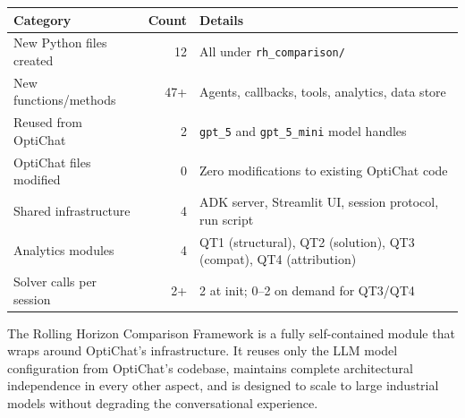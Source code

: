 \documentclass[11pt, a4paper]{article}
\begin{document}
\begin{center}
\begin{tabular}{lrl}
\toprule
\textbf{Category} & \textbf{Count} & \textbf{Details} \\
\midrule
New Python files created      & 12  & All under \texttt{rh\_comparison/} \\
New functions/methods          & 47+ & Agents, callbacks, tools, analytics, data store \\
Reused from OptiChat           & 2   & \texttt{gpt\_5} and \texttt{gpt\_5\_mini} model handles \\
OptiChat files modified        & 0   & Zero modifications to existing OptiChat code \\
Shared infrastructure          & 4   & ADK server, Streamlit UI, session protocol, run script \\
Analytics modules              & 4   & QT1 (structural), QT2 (solution), QT3 (compat), QT4 (attribution) \\
Solver calls per session       & 2+  & 2 at init; 0--2 on demand for QT3/QT4 \\
\bottomrule
\end{tabular}
\end{center}

The Rolling Horizon Comparison Framework is a fully self-contained module
that wraps around OptiChat's infrastructure.  It reuses only the LLM model
configuration from OptiChat's codebase, maintains complete architectural
independence in every other aspect, and is designed to scale to large
industrial models without degrading the conversational experience.
\end{document}
